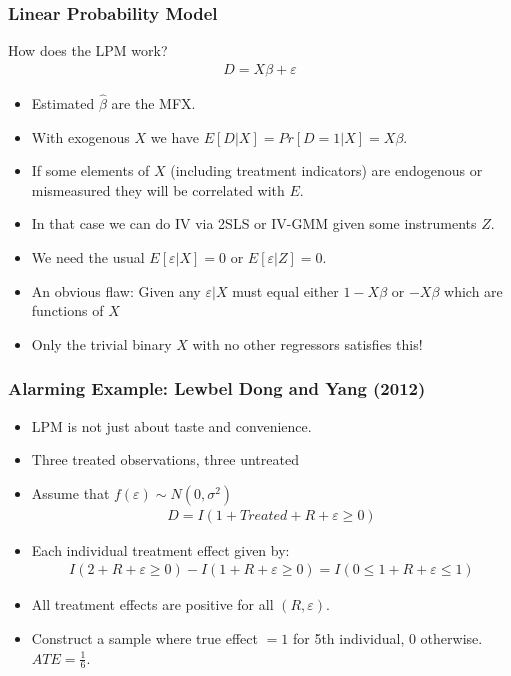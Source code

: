\documentclass[aspectratio=169]{beamer}
\begin{document}
\begin{frame}
\frametitle{Linear Probability Model}
How does the LPM work?
\begin{eqnarray*}
D = X \beta + \varepsilon
\end{eqnarray*}
\begin{itemize}
\item Estimated $\hat{\beta}$ are the MFX.
\item With exogenous $X$ we have $E[D | X] = Pr[D=1 | X] = X \beta$.
\item If some elements of $X$ (including treatment indicators) are endogenous or mismeasured they will be correlated with $E$.
\item In that case we can do IV via 2SLS or IV-GMM given some instruments $Z$.
\item We need the usual $E[\varepsilon  | X]= 0 $ or $E[\varepsilon | Z] = 0$. \pause
\item An obvious flaw: Given any $\varepsilon | X  $ must equal either $1- X \beta$ or $-X \beta$ which are functions of $X$
\item \alert{Only the trivial binary $X$ with no other regressors satisfies this!}
\end{itemize}
\end{frame}
\begin{frame}
\frametitle{Alarming Example: Lewbel Dong and Yang (2012)}
\begin{itemize}
\item LPM is not just about taste and convenience.
\item Three treated observations, three untreated %
\item Assume that $f(\varepsilon) \sim N(0,\sigma^2)$
\begin{eqnarray*}
D = I ( 1 + Treated + R + \varepsilon \geq 0 ) 
\end{eqnarray*}
\item Each individual treatment effect given by:
\begin{eqnarray*}
 I ( 2 + R + \varepsilon \geq 0 ) -  I ( 1 + R + \varepsilon \geq 0 )  =  I ( 0 \leq 1 + R + \varepsilon \leq 1 ) 
\end{eqnarray*}
\item All treatment effects are positive for all $(R,\varepsilon)$.
\item Construct a sample where true effect $=1$ for 5th individual, 0 otherwise. $ATE= \frac{1}{6}$.
\end{itemize}
\end{frame}
\end{document}
